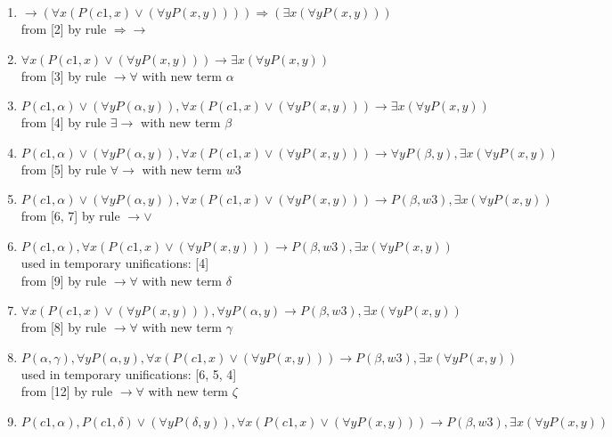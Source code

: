 \begin{enumerate}
\item $ \rightarrow  ( \forall  x (P(c1, x)  \vee  ( \forall  y P(x, y))))  \Rightarrow  ( \exists  x ( \forall  y P(x, y)))$\\
 from [2] by rule $ \Rightarrow \rightarrow $
\item $ \forall  x (P(c1, x)  \vee  ( \forall  y P(x, y))) \rightarrow   \exists  x ( \forall  y P(x, y))$\\
 from [3] by rule $\rightarrow \forall $ with new term $\alpha$
\item $P(c1, \alpha)  \vee  ( \forall  y P(\alpha, y)),  \forall  x (P(c1, x)  \vee  ( \forall  y P(x, y))) \rightarrow   \exists  x ( \forall  y P(x, y))$\\
 from [4] by rule $\exists \rightarrow $ with new term $\beta$
\item $P(c1, \alpha)  \vee  ( \forall  y P(\alpha, y)),  \forall  x (P(c1, x)  \vee  ( \forall  y P(x, y))) \rightarrow   \forall  y P(\beta, y),  \exists  x ( \forall  y P(x, y))$\\
 from [5] by rule $\forall \rightarrow $ with new term $w3$
\item $P(c1, \alpha)  \vee  ( \forall  y P(\alpha, y)),  \forall  x (P(c1, x)  \vee  ( \forall  y P(x, y))) \rightarrow  P(\beta, w3),  \exists  x ( \forall  y P(x, y))$\\
 from [6, 7] by rule $\rightarrow  \vee $
\item $P(c1, \alpha),  \forall  x (P(c1, x)  \vee  ( \forall  y P(x, y))) \rightarrow  P(\beta, w3),  \exists  x ( \forall  y P(x, y))$\\
  used in temporary unifications: [4]\\
 from [9] by rule $\rightarrow \forall $ with new term $\delta$
\item $ \forall  x (P(c1, x)  \vee  ( \forall  y P(x, y))),  \forall  y P(\alpha, y) \rightarrow  P(\beta, w3),  \exists  x ( \forall  y P(x, y))$\\
 from [8] by rule $\rightarrow \forall $ with new term $\gamma$
\item $P(\alpha, \gamma),  \forall  y P(\alpha, y),  \forall  x (P(c1, x)  \vee  ( \forall  y P(x, y))) \rightarrow  P(\beta, w3),  \exists  x ( \forall  y P(x, y))$\\
  used in temporary unifications: [6, 5, 4]\\
 from [12] by rule $\rightarrow \forall $ with new term $\zeta$
\item $P(c1, \alpha), P(c1, \delta)  \vee  ( \forall  y P(\delta, y)),  \forall  x (P(c1, x)  \vee  ( \forall  y P(x, y))) \rightarrow  P(\beta, w3),  \exists  x ( \forall  y P(x, y))$\\

\end{enumerate}

